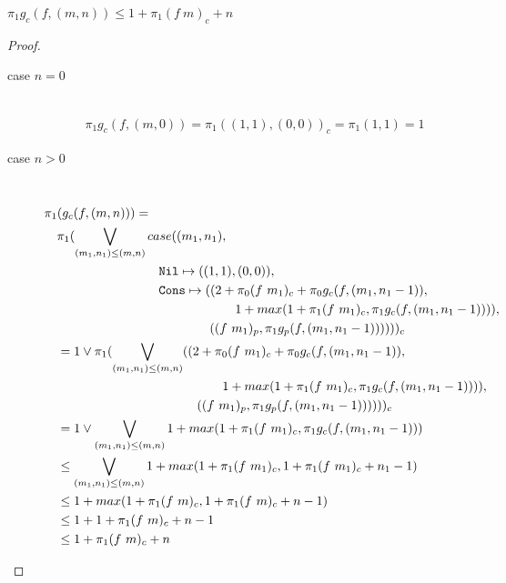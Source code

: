 \begin{theorem}
  $\pi_1 g_c(f, (m, n)) \leq 1 + \pi_1 (f\ m)_c + n$
\end{theorem}
\begin{proof}
  \begin{description}
    \item[case $n=0$]\mbox{}\\[-1.5\baselineskip]
      \begin{align*}
      \pi_1 g_c(f, (m, 0)) = \pi_1((1, 1), (0, 0))_c = \pi_1(1, 1) = 1 
      \end{align*}
    \item[case $n>0$]\mbox{}\\[-1.5\baselineskip]
      \[\begin{split}
        &\pi_1(g_c(f, (m, n))) = \\
        &\quad \pi_1(\bigvee\limits_{(m_1, n_1) \leq (m, n)} case((m_1, n_1), \\
        &\quadfive\quadfour \T{Nil} \mapsto ((1, 1), (0, 0)), \\
        &\quadfive\quadfour \T{Cons} \mapsto ((2 + \pi_0(f\ m_1)_c + \pi_0g_c(f, (m_1, n_1-1)), \\
        &\quadfive\quadten                     1 + max(1 + \pi_1(f\ m_1)_c, \pi_1g_c(f, (m_1, n_1-1)))), \\
        &\quadfive\quadeight                  ((f\ m_1)_p, \pi_1 g_p(f, (m_1, n_1-1))))) )_c \\
        &\quad = 1 \vee \pi_1(\bigvee\limits_{(m_1, n_1) \leq (m, n)} ((2 + \pi_0(f\ m_1)_c + \pi_0g_c(f, (m_1, n_1-1)), \\
        &\quadfour\quadten                     1 + max(1 + \pi_1(f\ m_1)_c, \pi_1g_c(f, (m_1, n_1-1)))), \\
        &\quadfour\quadeight                  ((f\ m_1)_p, \pi_1 g_p(f, (m_1, n_1-1))))) )_c \\
        &\quad = 1 \vee \bigvee\limits_{(m_1, n_1) \leq (m, n)} 1 + max(1 + \pi_1 (f\ m_1)_c, \pi_1 g_c(f, (m_1, n_1-1))) \\
        &\quad \leq \bigvee\limits_{(m_1, n_1) \leq (m, n)} 1 + max(1 + \pi_1 (f\ m_1)_c, 1 + \pi_1 (f\ m_1)_c + n_1 - 1) \\
        &\quad \leq 1 + max(1 + \pi_1 (f\ m)_c, 1 + \pi_1 (f\ m)_c + n - 1) \\
        &\quad \leq 1 + 1 + \pi_1 (f\ m)_c + n - 1 \\
        &\quad \leq 1 + \pi_1 (f\ m)_c + n
      \end{split}\]
  \end{description}
\end{proof}


